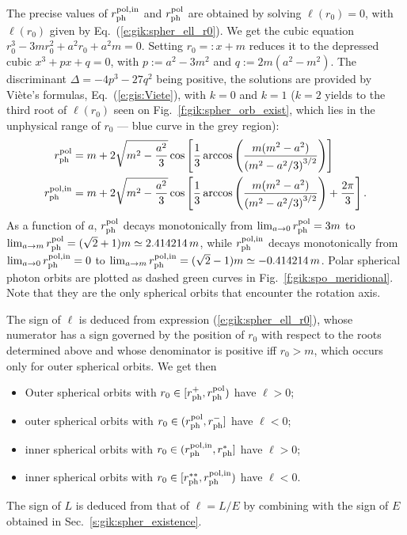 The precise values of $r_{\rm ph}^{\rm pol,in}$ and
$r_{\rm ph}^{\rm pol}$ are obtained by solving $\ell(r_0) = 0$,
with $\ell(r_0)$ given by Eq.~(\ref{e:gik:spher_ell_r0}). We get the cubic
equation $r_0^3 - 3 m r_0^2 + a^2 r_0 + a^2 m = 0$. Setting $r_0 =: x + m$ reduces
it to the depressed cubic $x^3 + p x + q = 0$, with $p := a^2 - 3 m^2$
and $q := 2m (a^2 - m^2)$. The discriminant $\mathit{\Delta} = - 4 p^3 - 27 q^2$
being positive, the solutions are provided by Viète's formulas, Eq.~(\ref{e:gis:Viete}),
with $k=0$ and $k=1$ ($k=2$ yields to the third root of $\ell(r_0)$ seen on
Fig.~\ref{f:gik:spher_orb_exist}, which lies
in the unphysical range of $r_0$ --- blue curve in the grey region):
\begin{subequations}
\begin{align}
    r_{\rm ph}^{\rm pol} & = m + 2 \sqrt{m^2 - \frac{a^2}{3}}
        \cos\left[ \frac{1}{3}\arccos \left(
        \frac{m(m^2 - a^2)}{\left( m^2 - {a^2}/{3} \right) ^{3/2}} \right) \right] \\
    r_{\rm ph}^{\rm pol,in} & = m + 2 \sqrt{m^2 - \frac{a^2}{3}}
        \cos\left[ \frac{1}{3}\arccos \left(
        \frac{m(m^2 - a^2)}{\left( m^2 - {a^2}/{3} \right) ^{3/2}} \right) + \frac{2\pi}{3} \right] .
\end{align}
\end{subequations}
As a function of $a$, $r_{\rm ph}^{\rm pol}$ decays monotonically from
$\lim_{a\to 0} r_{\rm ph}^{\rm pol} = 3 m$ to
$\lim_{a\to m} r_{\rm ph}^{\rm pol} = (\sqrt{2} + 1) m \simeq 2.414214\, m$,
while $r_{\rm ph}^{\rm pol,in}$ decays monotonically from
$\lim_{a\to 0} r_{\rm ph}^{\rm pol,in} = 0$ to
$\lim_{a\to m} r_{\rm ph}^{\rm pol,in} = (\sqrt{2} - 1) m \simeq -0.414214\, m$.
Polar spherical photon orbits are plotted as dashed green curves in Fig.~\ref{f:gik:spo_meridional}.
Note that they are the only spherical orbits that encounter the rotation axis.

The sign of $\ell$ is deduced from expression (\ref{e:gik:spher_ell_r0}),
whose numerator has a sign governed by the position of $r_0$ with respect to the
roots determined above and whose denominator is positive iff $r_0 > m$, which occurs
only for outer spherical orbits. We get then
\begin{greybox}
\begin{itemize}
\item Outer spherical orbits with $r_0 \in [r_{\rm ph}^+, r_{\rm ph}^{\rm pol})$ %
have $\ell > 0$;
\item outer spherical orbits with $r_0 \in (r_{\rm ph}^{\rm pol}, r_{\rm ph}^-]$ %
have $\ell < 0$;
\item inner spherical orbits with $r_0 \in (r_{\rm ph}^{\rm pol,in}, r_{\rm ph}^*]$
have $\ell > 0$;
\item inner spherical orbits with $r_0 \in [r_{\rm ph}^{**}, r_{\rm ph}^{\rm pol,in})$ %
have $\ell < 0$.
\end{itemize}
\end{greybox}
The sign of $L$ is deduced from that of $\ell = L/E$ by combining with the sign of $E$ obtained
in Sec.~\ref{s:gik:spher_existence}.


